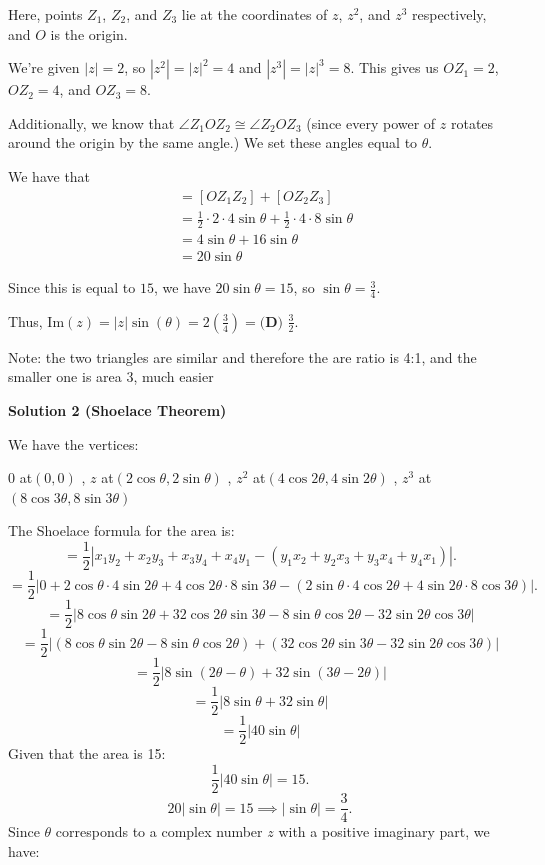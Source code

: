 \begin{enumerate}
 Here, points $Z_1$, $Z_2$, and $Z_3$ lie at the coordinates of $z$, $z^2$, and $z^3$ respectively, and $O$ is the origin.

 We're given $|z|=2$, so $|z^2|=|z|^2=4$ and $|z^3|=|z|^3 = 8$. This gives us $OZ_1=2$, $OZ_2=4$, and $OZ_3=8$.

 Additionally, we know that $\angle{Z_1OZ_2}\cong\angle{Z_2OZ_3}$ (since every power of $z$ rotates around the origin by the same angle.) We set these angles equal to $\theta$.

 We have that \begin{align*}[OZ_1Z_2Z_3]&=[OZ_1Z_2]+[OZ_2Z_3] \\&=\frac{1}{2}\cdot2\cdot4 \sin\theta+\frac{1}{2}\cdot4\cdot8 \sin\theta \\&=4\sin\theta+16\sin\theta \\&=20 \sin\theta\end{align*}


 Since this is equal to $15$, we have $20\sin\theta=15$, so $\sin\theta=\frac{3}{4}$.

 Thus, $\text{Im}(z)=|z|\sin(\theta)=2(\frac{3}{4})=\boxed{\textbf{(D) }\frac{3}{2}}$.

 Note: the two triangles are similar and therefore the are ratio is 4:1, and the smaller one is area 3, much easier

 



\textbf{Solution 2 (Shoelace Theorem)}

We have the vertices:

 $0$ at$(0, 0)$ , $z$ at$(2\cos \theta, 2\sin \theta)$ , $z^2$ at$(4\cos 2\theta, 4\sin 2\theta)$ , $z^3$ at$(8\cos 3\theta, 8\sin 3\theta)$

 The Shoelace formula for the area is:
 \[= \frac{1}{2} \left| x_1 y_2 + x_2 y_3 + x_3 y_4 + x_4 y_1 - (y_1 x_2 + y_2 x_3 + y_3 x_4 + y_4 x_1) \right|.\]
 \[= \frac{1}{2} \left| 0 + 2\cos \theta \cdot 4\sin 2\theta + 4\cos 2\theta \cdot 8\sin 3\theta - (2\sin \theta \cdot 4\cos 2\theta + 4\sin 2\theta \cdot 8\cos 3\theta) \right|.\]
 \[= \frac{1}{2} \left| 8\cos \theta \sin 2\theta + 32\cos 2\theta \sin 3\theta - 8\sin \theta \cos 2\theta - 32\sin 2\theta \cos 3\theta \right|\]
 \[= \frac{1}{2} \left|(8\cos \theta \sin 2\theta - 8\sin \theta \cos 2\theta)  + (32\cos 2\theta \sin 3\theta - 32\sin 2\theta \cos 3\theta)  \right|\]
 \[= \frac{1}{2} \left|8\sin(2\theta - \theta)  + 32\sin(3\theta - 2\theta)  \right|\]
 \[= \frac{1}{2} \left| 8\sin \theta + 32\sin \theta \right|\]
 \[= \frac{1}{2} \left| 40\sin \theta \right|\]Given that the area is 15:
 \[\frac{1}{2} \left| 40\sin \theta \right| = 15.\]
 \[20|\sin \theta| = 15 \implies |\sin \theta| = \frac{3}{4}.\]Since $\theta$ corresponds to a complex number $z$ with a positive imaginary part, we have:


\end{enumerate}
